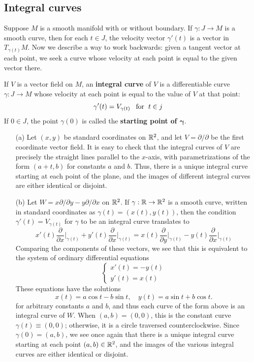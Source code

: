 \subsection{Integral curves}
Suppose $M$ is a smooth manifold with or without boundary. If $\gamma:J\to M$ is a smooth curve, then for each $t\in J$, the velocity vector $\gamma'(t)$ is a vector in $T_{\gamma(t)}M$. Now we describe a way to work backwards: given a tangent vector at each point, we seek a curve whose velocity at each point is equal to the given vector there.\par
If $V$ is a vector field on $M$, an \textbf{integral curve} of $V$ is a differentiable curve $\gamma:J\to M$ whose velocity at each point is equal to the value of $V$ at that point:
\[\gamma'(t)=V_{\gamma(t)}\hspace{8pt}\text{for}\hspace{6pt} t\in j\]
If $0\in J$, the point $\gamma(0)$ is called the \textbf{starting point of $\bm{\gamma}$}.
\begin{example}\label{integral curve eg}
\mbox{}
\begin{itemize}
\item[(a)] Let $(x,y)$ be standard coordinates on $\mathbb{R}^2$, and let $V=\partial/\partial$ be the first coordinate vector field. It is easy to check that the integral curves of $V$ are precisely the straight lines parallel to the $x$-axis, with parametrizations of the form $(a+t,b)$ for constants $a$ and $b$. Thus, there is a unique integral curve starting at each point of the plane, and the images of different integral curves are either identical or disjoint.
\item[(b)] Let $W=x\partial/\partial y-y\partial/\partial x$ on $\mathbb{R}^2$. If $\gamma:\mathbb{R}\to\mathbb{R}^2$ is a smooth curve, written in standard coordinates as $\gamma(t)=(x(t),y(t))$, then the condition $\gamma'(t)=V_{\gamma(t)}$ for $\gamma$ to be an integral curve translates to
\[x'(t)\frac{\partial}{\partial x}\Big|_{\gamma(t)}+y'(t)\frac{\partial}{\partial x}\Big|_{\gamma(t)}=x(t)\frac{\partial}{\partial y}\Big|_{\gamma(t)}-y(t)\frac{\partial}{\partial x}\Big|_{\gamma(t)}\]
Comparing the components of these vectors, we see that this is equivalent to the system of ordinary differential equations
\[\left\{\begin{array}{l}
x'(t)=-y(t)\\
y'(t)=x(t)
\end{array}\right. \]
These equations have the solutions
\[x(t)=a\cos t-b\sin t,\quad y(t)=a\sin t+b\cos t.\]
for arbitrary constants $a$ and $b$, and thus each curve of the form above is an integral curve of $W$. When $(a,b)=(0,0)$, this is the constant curve $\gamma(t)\equiv(0,0)$; otherwise, it is a circle traversed counterclockwise.
Since $\gamma(0)=(a,b)$, we see once again that there is a unique integral curve starting at each point $(a,b)\in\mathbb{R}^2$, and the images of the various integral curves are either identical or disjoint.
\end{itemize}
\end{example}

